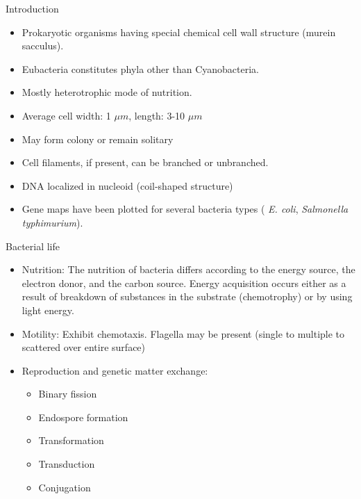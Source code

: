 \documentclass[ignorenonframetext,aspectratio=169]{beamer}
\providecommand{\tightlist}{%
  \setlength{\itemsep}{0pt}\setlength{\parskip}{0pt}}
\begin{document}
\begin{frame}{Introduction}
\protect\hypertarget{introduction}{}

\begin{itemize}
\tightlist
\item
  Prokaryotic organisms having special chemical cell wall structure
  (murein sacculus).
\item
  Eubacteria constitutes phyla other than Cyanobacteria.
\item
  Mostly heterotrophic mode of nutrition.
\item
  Average cell width: 1 \(\mu m\), length: 3-10 \(\mu m\)
\item
  May form colony or remain solitary
\item
  Cell filaments, if present, can be branched or unbranched.
\item
  DNA localized in nucleoid (coil-shaped structure)
\item
  Gene maps have been plotted for several bacteria types ( \emph{E.
  coli}, \emph{Salmonella typhimurium}).
\end{itemize}

\end{frame}

\begin{frame}{Bacterial life}
\protect\hypertarget{bacterial-life}{}

\begin{itemize}
\tightlist
\item
  \alert{Nutrition}: The nutrition of bacteria differs according to the
  energy source, the electron donor, and the carbon source. Energy
  acquisition occurs either as a result of breakdown of substances in
  the substrate (chemotrophy) or by using light energy.
\item
  \alert{Motility}: Exhibit chemotaxis. Flagella may be present (single
  to multiple to scattered over entire surface)
\item
  \alert{Reproduction and genetic matter exchange}:

  \begin{itemize}
  \tightlist
  \item
    Binary fission
  \item
    Endospore formation
  \item
    Transformation
  \item
    Transduction
  \item
    Conjugation
  \end{itemize}
\end{itemize}

\end{frame}
\end{document}
